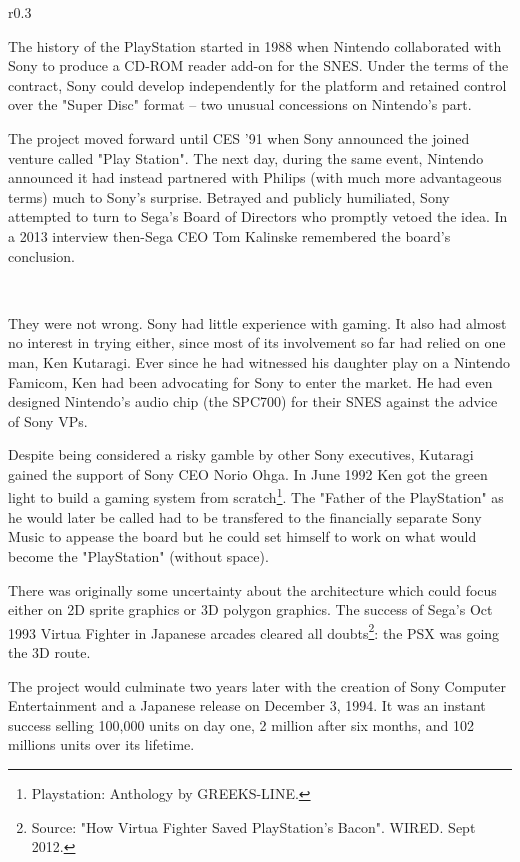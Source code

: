 \begin{wrapfigure}[11]{r}{0.3\textwidth}{
\centering {}}
\end{wrapfigure}
The history of the PlayStation started in 1988 when Nintendo collaborated with Sony to produce a CD-ROM reader add-on for the SNES. Under the terms of the contract, Sony could develop independently for the platform and retained control over the "Super Disc" format -- two unusual concessions on Nintendo's part.\\
\par
 The project moved forward until CES '91 when Sony announced the joined venture called "Play Station". The next day, during the same event, Nintendo announced it had instead partnered with Philips (with much more advantageous terms) much to Sony's surprise. Betrayed and publicly humiliated, Sony attempted to turn to Sega's Board of Directors who promptly vetoed the idea. In a 2013 interview then-Sega CEO Tom Kalinske remembered the board's conclusion.\\
\par
{}\\
\par
They were not wrong. Sony had little experience with gaming. It also had almost no interest in trying either, since most of its involvement so far had relied on one man, Ken Kutaragi. Ever since he had witnessed his daughter play on a Nintendo Famicom, Ken had been advocating for Sony to enter the market. He had even designed Nintendo's audio chip (the SPC700) for their SNES against the advice of Sony VPs.\\
\par
 Despite being considered a risky gamble by other Sony executives, Kutaragi gained the support of Sony CEO Norio Ohga. In June 1992 Ken got the green light to build a gaming system from scratch\footnote{Playstation: Anthology by GREEKS-LINE.}. The "Father of the PlayStation" as he would later be called had to be transfered to the financially separate Sony Music to appease the board but he could set himself to work on what would become the "PlayStation" (without space).\\
\par
There was originally some uncertainty about the architecture which could focus either on 2D sprite graphics or 3D polygon graphics. The success of Sega's Oct 1993 Virtua Fighter in Japanese arcades cleared all doubts\footnote{Source: "How Virtua Fighter Saved PlayStation's Bacon". WIRED. Sept 2012.}: the PSX was going the 3D route.\\
\par
The project would culminate two years later with the creation of Sony Computer Entertainment and a Japanese release on December 3, 1994. It was an instant success selling 100,000 units on day one, 2 million after six months, and 102 millions units over its lifetime.\\
\par


